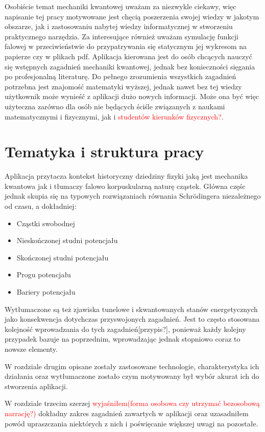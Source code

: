 \documentclass{SGGW-thesis}
\begin{document}
	Osobiście temat mechaniki kwantowej uważam za niezwykle ciekawy, więc napisanie tej pracy motywowane jest chęcią poszerzenia swojej wiedzy w jakotym obszarze, jak i zastosowaniu nabytej wiedzy informatycznej w stworzeniu praktycznego narzędzia. Za interesujące również uważam symulację funkcji falowej w przeciwieństwie do przypatrywania się statycznym jej wykresom na papierze czy w plikach pdf. Aplikacja kierowana jest do osób chcących nauczyć się wstępnych zagadnień mechaniki kwantowej, jednak bez konieczności sięgania po profesjonalną literaturę. Do pełnego zrozumienia wszystkich zagadnień potrzebna jest znajomość matematyki wyższej, jednak nawet bez tej wiedzy użytkownik może wynieść z aplikacji dużo nowych informacji. Może ona być więc użyteczna zarówno dla osób nie będących ściśle związanych z naukami matematycznymi i fizycznymi, jak i \textcolor{red}{studentów kierunków fizycznych?}.
	\section{Tematyka i struktura pracy}
	Aplikacja przytacza kontekst historyczny dziedziny fizyki jaką jest mechanika kwantowa jak i tłumaczy falowo korpuskularną naturę cząstek. Główna częśc jednak skupia się na typowych rozwiązaniach równania Schrödingera niezależnego od czasu, a dokładniej:
	\begin{itemize}
	\item Cząstki swobodnej
	\item Nieskończonej studni potencjału
	\item Skończonej studni potencjału
	\item Progu potencjału
	\item Bariery potencjału
	\end{itemize}
	
	Wytłumaczone są też zjawiska tunelowe i skwantowanych stanów energetycznych jako konsekwencja dotychczas przyswojonych zagadnień. Jest to często stosowana kolejność wprowadzania do tych zagadnień[przypis?], ponieważ każdy kolejny przypadek bazuje na poprzednim, wprowadzając jednak stopniowo coraz to nowsze elementy.
	
	W rozdziale drugim opisane zostały zastosowane technologie, charakterystyka ich działania oraz wytłumaczone zostało czym motywowany był wybór akurat ich do stworzenia aplikacji.
	
	W rozdziale trzecim szerzej \textcolor{red}{wyjaśniłem(forma osobowa czy utrzymać bezosobową narrację?)} dokładny zakres zagadnień zawartych w aplikacji oraz uzasadniłem powód upraszczania niektórych z nich i poświęcanie większej uwagi na pozostałe.
	
\end{document}
